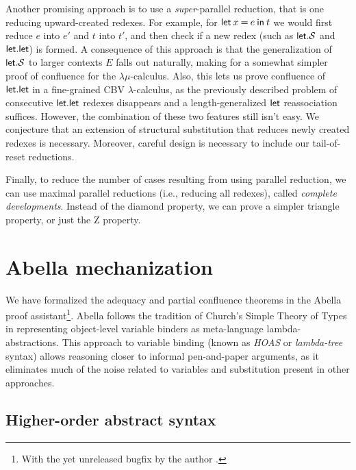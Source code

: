 \documentclass[a4paper, 11pt,titlepage, openright, twoside]{report}
\newcommand{\keyword}[1]{\textsf{\textup{#1}}}
\newcommand{\KwLet}{\keyword{let}}
\newcommand{\Let}[3]{\keyword{let}\:#1\:\keyword{=}\:#2\:\keyword{in}\:#3}
\renewcommand{\S}{\mathcal{S}}
\newcommand{\+}{\enspace}
\begin{document}

Another promising approach is to use a \textit{super}-parallel reduction, that is one reducing upward-created redexes.
For example, for $\Let{x}{e}{t}$ we would first reduce $e$ into $e'$ and $t$ into $t'$,
and then check if a new redex (such as $\KwLet{}.\S$ and $\KwLet{}.\KwLet{}$) is formed.
A consequence of this approach is that the generalization of $\KwLet{}.\S$ to larger contexts $E$
falls out naturally, making for a somewhat simpler proof of confluence for the $λμ$-calculus.
Also, this lets us prove confluence of $\KwLet{}.\KwLet{}$ in a fine-grained CBV $λ$-calculus,
as the previously described problem of consecutive $\KwLet{}.\KwLet{}$ redexes disappears
and a length-generalized $\KwLet{}$ reassociation suffices.
However, the combination of these two features still isn't easy.
We conjecture that an extension of structural substitution that reduces newly created redexes is necessary. Moreover, careful design is necessary to include our tail-of-reset reductions.

Finally, to reduce the number of cases resulting from using parallel reduction,
we can use maximal parallel reductions (i.e., reducing all redexes), called
\textit{complete developments}.
Instead of the diamond property, we can prove a simpler triangle property,
or just the Z property.

\chapter{Abella mechanization}

We have formalized the adequacy and partial confluence theorems in the Abella proof assistant\footnote{
	With the yet unreleased bugfix by the author \cite{abellafix}.
}.
Abella follows the tradition of Church's Simple Theory of Types
in representing object-level variable binders as meta-language lambda-abstractions.
This approach to variable binding (known as \textit{HOAS} or \textit{lambda-tree} syntax)
allows reasoning closer to informal pen-and-paper arguments, as it eliminates
much of the noise related to variables and substitution present in other approaches.

\section{Higher-order abstract syntax}
\end{document}
